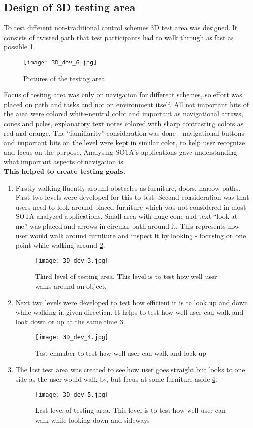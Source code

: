 \subsection{Design of 3D testing area}
To test different non-traditional control schemes 3D test area was designed. It consists of twisted path that test participants had to walk through as fast as possible \ref{TestLevels}.
\begin{figure}[H]
\centering
\texttt{[image: 3D\_dev\_6.jpg]}
\caption{Pictures of the testing area}
\label{TestLevels}
\end{figure}
Focus of testing area was only on navigation for different schemes, so effort was placed on path and tasks and not on environment itself. All not important bits of the area were colored white-neutral color and important as navigational arrows, cones and poles, explanatory text notes colored with sharp contrasting colors as red and orange. The “familiarity” consideration was done - navigational buttons and important bits on the level were kept in similar color, to help user recognize and focus on the purpose.
Analysing SOTA’s applications gave understanding what important aspects of navigation is.
\\
  \textbf{This helped to create testing goals.}
\begin {enumerate}
\item Firstly walking fluently around obstacles as furniture, doors, narrow paths. First two levels were developed for this to test. Second consideration was that users need to look around placed furniture which was not considered in most SOTA analyzed applications. Small area with huge cone and text “look at me” was placed and arrows in circular path around it. This represents how user would walk around furniture and inspect it by looking - focusing on one point while walking around \ref{TestLevel3}.
\begin{figure}[H]
\centering
\texttt{[image: 3D\_dev\_3.jpg]}
\caption{Third level of testing area. This level is to test how well user walks around an object.}
\label{TestLevel3}
\end{figure}
\item Next two levels were developed to test how efficient it is to look up and down while walking in given direction. It helps to test how well user can walk and look down or up at the same time \ref{TestLevel4}.
\begin{figure}[H]
\centering
\texttt{[image: 3D\_dev\_4.jpg]}
\caption{Test chamber to test how well user can walk and look up}
\label{TestLevel4}
\end{figure}
\item The last test area was created to see how user goes straight but looks to one side as the user would walk-by, but focus at some furniture aside \ref{TestLevel5}.
\begin{figure}[H]
\centering
\texttt{[image: 3D\_dev\_5.jpg]}
\caption{Last level of testing area. This level is to test how well user can walk while looking down and sideways}
\label{TestLevel5}
\end{figure}
\end{enumerate} 
